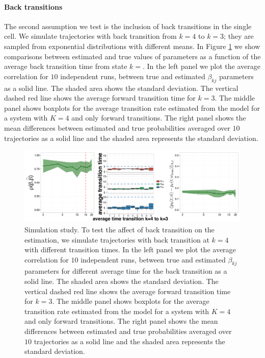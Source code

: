 \paragraph{Back transitions}
\label{sec:back-transitions}

The second assumption we test is the inclusion of back transitions in the single cell. We simulate trajectories with back transition from $k=4$ to $k=3$; they are sampled from exponential distributions with different means. In Figure \ref{fig:back} we show comparisons between estimated and true values of parameters as a function of the average back transition time from state $k=$. In the left panel we plot the average correlation for $10$ independent runs, between true and estimated $\beta_{kj}$ parameters as a solid line. The shaded area shows the standard deviation. The vertical dashed red line shows the average forward transition time for $k=3$. The middle panel shows boxplots for the average transition rate estimated from the model for a system with $K=4$ and only forward transitions. The right panel shows the mean differences between estimated and true probabilities averaged over $10$ trajectories as a solid line and the shaded area represents the standard deviation.

\begin{figure}[h]
  \centering \includegraphics[width=1\textwidth]{pics/back-trans.pdf}
  \caption{Simulation study. To test the affect of back transition on the estimation, we simulate trajectories with back transition at $k=4$ with different transition times. In the left panel we plot the average correlation for $10$ independent runs, between true and estimated $\beta_{kj}$ parameters for different average time for the back transition as a solid line. The shaded area shows the standard deviation. The vertical dashed red line shows the average forward transition time for $k=3$. The middle panel shows boxplots for the average transition rate estimated from the model for a system with $K=4$ and only forward transitions. The right panel shows the mean differences between estimated and true probabilities averaged over $10$ trajectories as a solid line and the shaded area represents the standard deviation.}
    \label{fig:back}
\end{figure}

